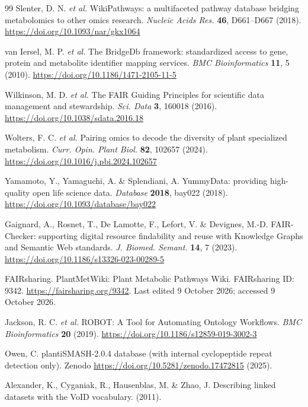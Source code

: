 \documentclass[11pt,a4paper]{article}
\begin{document}
\begin{thebibliography}{99}
Slenter, D. N. \textit{et al.} WikiPathways: a multifaceted pathway database bridging metabolomics to other omics research. \textit{Nucleic Acids Res.} \textbf{46}, D661--D667 (2018). \url{https://doi.org/10.1093/nar/gkx1064}

van Iersel, M. P. \textit{et al.} The BridgeDb framework: standardized access to gene, protein and metabolite identifier mapping services. \textit{BMC Bioinformatics} \textbf{11}, 5 (2010). \url{https://doi.org/10.1186/1471-2105-11-5}

Wilkinson, M. D. \textit{et al.} The FAIR Guiding Principles for scientific data management and
stewardship. \textit{Sci. Data} \textbf{3}, 160018 (2016).
\url{https://doi.org/10.1038/sdata.2016.18}

Wolters, F. C. \textit{et al.} Pairing omics to decode the diversity of plant specialized metabolism. \textit{Curr. Opin. Plant Biol.} \textbf{82}, 102657 (2024). \url{https://doi.org/10.1016/j.pbi.2024.102657}

Yamamoto, Y., Yamaguchi, A. \& Splendiani, A. YummyData: providing high-quality open life science
data. \textit{Database} \textbf{2018}, bay022 (2018). \url{https://doi.org/10.1093/database/bay022}

Gaignard, A., Rosnet, T., De Lamotte, F., Lefort, V. \& Devignes, M.-D. FAIR-Checker: supporting
digital resource findability and reuse with Knowledge Graphs and Semantic Web standards. \textit{J.
Biomed. Semant.} \textbf{14}, 7 (2023). \url{https://doi.org/10.1186/s13326-023-00289-5}

FAIRsharing. PlantMetWiki: Plant Metabolic Pathways Wiki. FAIRsharing ID: 9342.
\url{https://fairsharing.org/9342}. Last edited 9 October 2026; accessed 9 October 2026.

Jackson, R. C. \textit{et al.} ROBOT: A Tool for Automating Ontology Workflows. \textit{BMC Bioinformatics} \textbf{20} (2019). \url{https://doi.org/10.1186/s12859-019-3002-3}

Owen, C. plantiSMASH-2.0.4 database (with internal cyclopeptide repeat detection only). Zenodo \url{https://doi.org/10.5281/zenodo.17472815} (2025).

Alexander, K., Cyganiak, R., Hausenblas, M. \& Zhao, J. Describing linked datasets with the VoID vocabulary. (2011).


\end{thebibliography}
\end{document}
